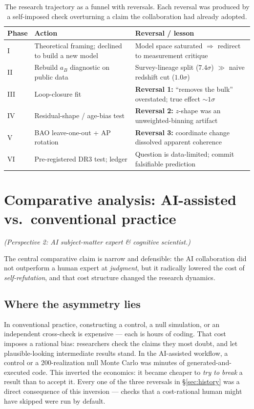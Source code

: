 \documentclass[11pt]{article}
\begin{document}
\begin{table}[t]
\centering
\small
\begin{tabular}{@{}p{1.6cm}p{5.2cm}p{6.4cm}@{}}
\toprule
\textbf{Phase} & \textbf{Action} & \textbf{Reversal / lesson} \\
\midrule
I & Theoretical framing; declined to build a new model & Model space saturated $\Rightarrow$ redirect to measurement critique \\
II & Rebuild $a_B$ diagnostic on public data & Survey-lineage split ($7.4\sigma$) $\gg$ naive redshift cut ($1.0\sigma$) \\
III & Loop-closure fit & \textbf{Reversal 1:} ``removes the bulk'' overstated; true effect $\sim\!1\sigma$ \\
IV & Residual-shape / age-bias test & \textbf{Reversal 2:} $z$-shape was an unweighted-binning artifact \\
V & BAO leave-one-out + AP rotation & \textbf{Reversal 3:} coordinate change dissolved apparent coherence \\
VI & Pre-registered DR3 test; ledger & Question is data-limited; commit falsifiable prediction \\
\bottomrule
\end{tabular}
\caption{The research trajectory as a funnel with reversals. Each reversal was produced by a self-imposed check overturning a claim the collaboration had already adopted.}
\label{tab:trajectory}
\end{table}

\section{Comparative analysis: AI-assisted vs.\ conventional practice}
\label{sec:comparison}
\emph{(Perspective 2: AI subject-matter expert \& cognitive scientist.)}

The central comparative claim is narrow and defensible: the AI collaboration did not outperform a human expert at \emph{judgment}, but it radically lowered the cost of \emph{self-refutation}, and that cost structure changed the research dynamics.

\subsection{Where the asymmetry lies}
In conventional practice, constructing a control, a null simulation, or an independent cross-check is expensive --- each is hours of coding. That cost imposes a rational bias: researchers check the claims they most doubt, and let plausible-looking intermediate results stand. In the AI-assisted workflow, a control or a 200-realization null Monte Carlo was minutes of generated-and-executed code. This inverted the economics: it became cheaper to \emph{try to break} a result than to accept it. Every one of the three reversals in \S\ref{sec:history} was a direct consequence of this inversion --- checks that a cost-rational human might have skipped were run by default.
\end{document}
